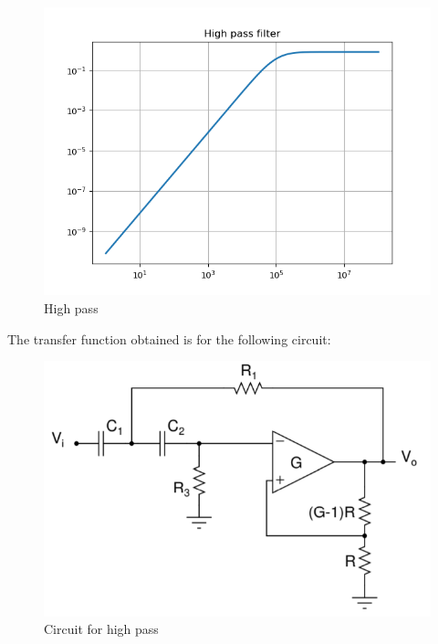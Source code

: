 \documentclass[12pt, a4paper]{report}
\begin{document}
  \begin{figure}
	\centering
	\includegraphics[scale=0.8]{figure_2..png}  %
	\caption{High pass}
	\label{fig:2}
\end{figure}

The transfer function obtained is for the following circuit:
  \begin{figure}
	\centering
	\includegraphics[scale=0.8]{figure_3...png}  %
	\caption{Circuit for high pass}
	\label{fig:3}
\end{figure}
\end{document}
